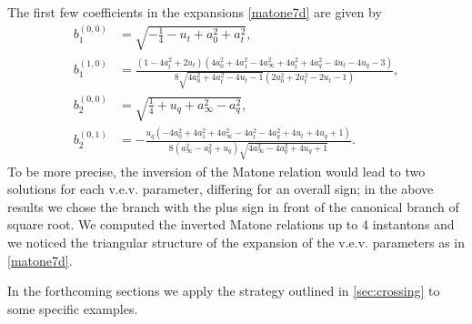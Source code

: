 \documentclass[11pt]{article}
\numberwithin{equation}{section}
\begin{document}
The first few  coefficients in the expansions \eqref{matone7d} are given by 
\begin{equation}
\begin{aligned}
b_1^{(0,0)}&=\sqrt{-\frac{1}{4}-u_{t}+a_{0}^2+a_{t}^2},\\
b_1^{(1,0)}&=\frac{\left(1-4 a_{t}^2+2 u_{t}\right) \left(4 a_{0}^2+4 a_{1}^2-4 a_{\infty}^2+4 a_{t}^2+4 a_{q}^2-4 u_{t}-4 u_{q}-3\right)}{8 \sqrt{4 a_{0}^2+4 a_{t}^2-4 u_{t}-1} \left(2 a_{0}^2+2 a_{t}^2-2 u_{t}-1\right)},\\
b_2^{(0,0)}&=\sqrt{\frac{1}{4}+u_{q}+a_{\infty}^2-a_{q}^2},\\
b_2^{(0,1)}&=-\frac{u_{q} \left(-4 a_{0}^2+4 a_{1}^2+4 a_{\infty}^2-4 a_{t}^2-4 a_{q}^2+4 u_{t}+4 u_{q}+1\right)}{8 \left(a_{\infty}^2-a_{q}^2+u_{q}\right) \sqrt{4 a_{\infty}^2-4 a_{q}^2+4 u_{q}+1}}.
\end{aligned}
\end{equation}
To be more precise, the inversion of the Matone relation would lead to two solutions for each v.e.v. parameter, differing for an overall sign; in the above results we chose the branch with the plus sign in front of the canonical branch of  square root.
We computed the inverted Matone relations up to 4 instantons and we noticed the triangular structure of the expansion of the v.e.v. parameters as in \autoref{matone7d}. 

In the forthcoming sections we apply the strategy outlined in \autoref{sec:crossing} to some specific examples.
\end{document}
